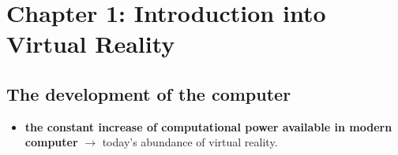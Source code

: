 \documentclass{standalone}
\begin{document}
\section{Chapter 1: Introduction into Virtual Reality}

\setcounter{subsection}{1}	%

\subsection{The development of the computer}

\begin{itemize}
	\item \textbf{the constant increase of computational power available in modern computer} $\rightarrow$ today's abundance of virtual reality. 
\end{itemize}
\end{document}

